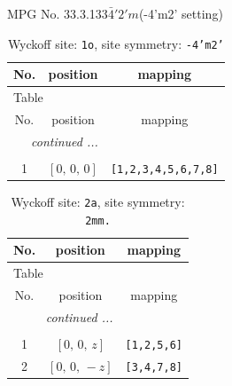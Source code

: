 \documentclass[fleqn,8pt]{jsarticle}
\begin{document}
\setcounter{MaxMatrixCols}{32}

\renewcommand{\tablename}{Table~}
\renewcommand{\figurename}{Figure~}
\begin{center}
\LARGE
MPG No. 33.3.133\quad$\bar{4}'2'm$\quad(-4'm2' setting)
\end{center}
\renewcommand{\arraystretch}{1.2}
\begin{longtable}{ccc}
\caption{Wyckoff site: {\tt 1o}, site symmetry: {\tt -4'm2'}}
 \\
 \hline \hline
No. & position & mapping \\ \hline \endfirsthead

\multicolumn{2}{l}{\tablename\ \thetable{}} \\
 \hline \hline
No. & position & mapping \\ \hline \endhead

 \hline \hline
\multicolumn{2}{r}{\footnotesize\it continued ...} \\ \endfoot

 \hline \hline
\multicolumn{2}{r}{} \\ \endlastfoot

1 & $\left[ 0,\, 0,\, 0 \right]$ & {\tt [1,2,3,4,5,6,7,8]} \\
\end{longtable}
\renewcommand{\arraystretch}{1.2}
\begin{longtable}{ccc}
\caption{Wyckoff site: {\tt 2a}, site symmetry: {\tt 2mm.}}
 \\
 \hline \hline
No. & position & mapping \\ \hline \endfirsthead

\multicolumn{2}{l}{\tablename\ \thetable{}} \\
 \hline \hline
No. & position & mapping \\ \hline \endhead

 \hline \hline
\multicolumn{2}{r}{\footnotesize\it continued ...} \\ \endfoot

 \hline \hline
\multicolumn{2}{r}{} \\ \endlastfoot

1 & $\left[ 0,\, 0,\, z \right]$ & {\tt [1,2,5,6]} \\ \hline
2 & $\left[ 0,\, 0,\, - z \right]$ & {\tt [3,4,7,8]} \\
\end{longtable}
\renewcommand{\arraystretch}{1.2}
\end{document}
